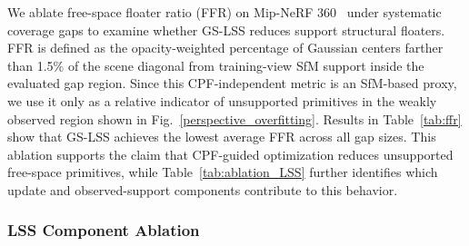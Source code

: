 \documentclass[lettersize,journal]{IEEEtran}
\begin{document}
We ablate free-space floater ratio (FFR) on Mip-NeRF 360~\cite{mipnerf360} under systematic coverage gaps to examine whether GS-LSS reduces support structural floaters. FFR is defined as the opacity-weighted percentage of Gaussian centers farther than 1.5\% of the scene diagonal from training-view SfM support inside the evaluated gap region. Since this CPF-independent metric is an SfM-based proxy, we use it only as a relative indicator of unsupported primitives in the weakly observed region shown in Fig.~\ref{perspective_overfitting}. Results in Table~\ref{tab:ffr} show that GS-LSS achieves the lowest average FFR across all gap sizes. This ablation supports the claim that CPF-guided optimization reduces unsupported free-space primitives, while Table~\ref{tab:ablation_LSS} further identifies which update and observed-support components contribute to this behavior.

\subsubsection{LSS Component Ablation}


\begin{table}[h]
    \centering
    \caption{Ablation studies of LSS parameterization, 
    evaluated on MatrixCity~\cite{matrixcity}. Best results highlighted in bold.}
    \label{tab:ablation_LSS}
\end{table}
\end{document}
